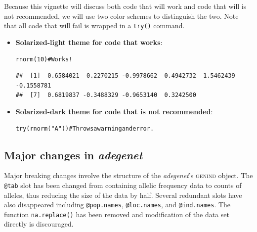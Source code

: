 \documentclass[letterpaper]{article}\usepackage[]{graphicx}\usepackage[]{color}
\makeatletter
\newcommand{\hlnum}[1]{\textcolor[rgb]{0.863,0.196,0.184}{#1}}%
\newcommand{\hlstr}[1]{\textcolor[rgb]{0.863,0.196,0.184}{#1}}%
\newcommand{\hlcom}[1]{\textcolor[rgb]{0.576,0.631,0.631}{#1}}%
\newcommand{\hlstd}[1]{\textcolor[rgb]{0.396,0.482,0.514}{#1}}%
\newcommand{\hlkwd}[1]{\textcolor[rgb]{0.345,0.431,0.459}{#1}}%
\newenvironment{kframe}{%
 \def\at@end@of@kframe{}%
 \ifinner\ifhmode%
  \def\at@end@of@kframe{\end{minipage}}%
  \begin{minipage}{\columnwidth}%
 \fi\fi%
 \def\FrameCommand##1{\hskip\@totalleftmargin \hskip-\fboxsep
 \colorbox{shadecolor}{##1}\hskip-\fboxsep
     \hskip-\linewidth \hskip-\@totalleftmargin \hskip\columnwidth}%
 \MakeFramed {\advance\hsize-\width
   \@totalleftmargin\z@ \linewidth\hsize
   \@setminipage}}%
 {\par\unskip\endMakeFramed%
 \at@end@of@kframe}
\newenvironment{knitrout}{}{} %
\newcommand{\adegenet}{\textit{adegenet}}
\makeatother
\begin{document}
Because this vignette will discuss both code that will work and code that will
is not recommended, we will use two color schemes to distinguish the two. Note
that all code that will fail is wrapped in a \texttt{try()} command.
\begin{itemize}
\item \textbf{Solarized-light theme for code that works}:
\begin{knitrout}
\color{fgcolor}\begin{kframe}
\begin{alltt}
\hlkwd{rnorm}\hlstd{(}\hlnum{10}\hlstd{)} \hlcom{# Works!}
\end{alltt}
\begin{verbatim}
##  [1]  0.6584021  0.2270215 -0.9978662  0.4942732  1.5462439 -0.1558781
##  [7]  0.6819837 -0.3488329 -0.9653140  0.3242500
\end{verbatim}
\end{kframe}
\end{knitrout}



\item \textbf{Solarized-dark theme for code that is not recommended}:
\begin{knitrout}
\color{fgcolor}\begin{kframe}
\begin{alltt}
\hlkwd{try}\hlstd{(}\hlkwd{rnorm}\hlstd{(}\hlstr{"A"}\hlstd{))} \hlcom{# Throws a warning and error.}
\end{alltt}


{\ttfamily\noindent{}}\end{kframe}
\end{knitrout}


\end{itemize}
\subsection{Major changes in \adegenet{}}

Major breaking changes involve the structure of the \adegenet{}'s \textsc{genind}
object. The \texttt{@tab} slot has been changed from containing allelic frequency
data to counts of alleles, thus reducing the size of the data by half. Several
redundant slots have also disappeared including \texttt{@pop.names}, 
\texttt{@loc.names}, and \texttt{@ind.names}. The function \texttt{na.replace()}
has been removed and modification of the data set directly is discouraged. 
\end{document}
